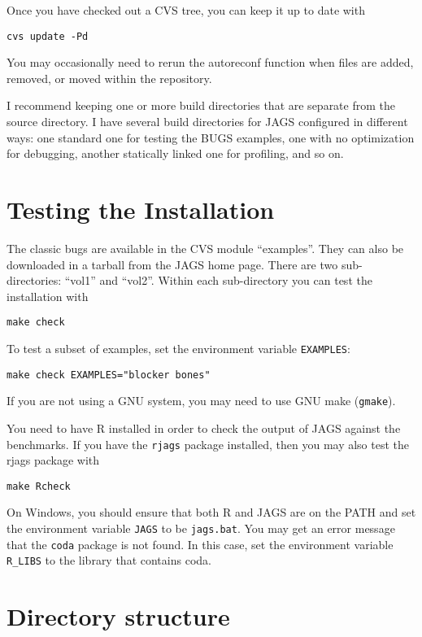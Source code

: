 \documentclass[11pt, a4paper, titlepage]{report}
\begin{document}
Once you have checked out a CVS tree, you can keep it up to date with
\begin{verbatim}
cvs update -Pd
\end{verbatim}
You may occasionally need to rerun the autoreconf function when files
are added, removed, or moved within the repository.

I recommend keeping one or more build directories that are separate
from the source directory. I have several build directories for JAGS
configured in different ways: one standard one for testing the BUGS
examples, one with no optimization for debugging, another statically
linked one for profiling, and so on.

\chapter{Testing the Installation}

The classic bugs are available in the CVS module ``examples''. They
can also be downloaded in a tarball from the JAGS home page. There are
two sub-directories: ``vol1'' and ``vol2''. Within each sub-directory
you can test the installation with
\begin{verbatim}
make check
\end{verbatim}
To test a subset of examples, set the environment variable \verb+EXAMPLES+:
\begin{verbatim}
make check EXAMPLES="blocker bones"
\end{verbatim}
If you are not using a GNU system, you may need to use GNU make
(\verb+gmake+).

You need to have R installed in order to check the output of JAGS
against the benchmarks.  If you have the \texttt{rjags} package
installed, then you may also test the rjags package with
\begin{verbatim}
make Rcheck
\end{verbatim}

On Windows, you should ensure that both R and JAGS are on the PATH and
set the environment variable \texttt{JAGS} to be \texttt{jags.bat}.
You may get an error message that the \texttt{coda} package is not
found. In this case, set the environment variable \verb+R_LIBS+ to
the library that contains coda.

\chapter{Directory structure}
\end{document}
